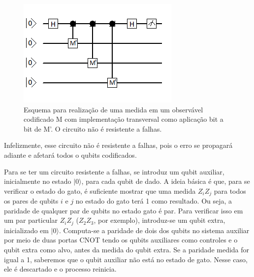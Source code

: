 \documentclass[tcc,capa]{texufpel}
\begin{document}
\begin{figure}
    \centering
    \includegraphics[width=.5\textwidth]{imagens/ExemplodeResistenciaqueNaoF.png}
    \caption{Esquema para realização de uma medida em um observável codificado M com implementação transversal como aplicação bit a bit de M'. O circuito não é resistente a falhas.}
    \label{fig:falhas}
\end{figure}

Infelizmente, esse circuito não é resistente a falhas, pois o erro se propagará adiante e afetará todos o qubits codificados.




Para se ter um circuito resistente a falhas, se introduz um qubit auxiliar, inicialmente no estado $|0\rangle$, para cada qubit de dado. A ideia básica é que, para se verificar o estado do gato, é suficiente mostrar que uma medida $Z_iZ_j$ para todos os pares de qubits $i$ e $j$ no estado do gato terá 1 como resultado. Ou seja, a paridade de qualquer par de qubits no estado gato é par. Para verificar isso em um par particular $Z_i Z_j$ ($Z_2 Z_3$, por exemplo), introduz-se um qubit extra, inicializado em $|0\rangle$. Computa-se a paridade de dois dos qubits no sistema auxiliar por meio de duas portas CNOT tendo os qubits auxiliares como controles e o qubit extra como alvo, antes da medida do qubit extra. Se a paridade medida for igual a 1, saberemos que o qubit auxiliar não está no estado de gato. Nesse caso, ele é descartado e o processo reinicia. 
\end{document}
